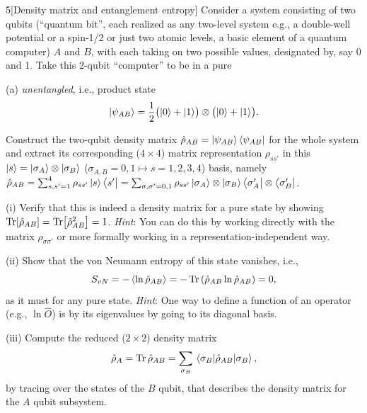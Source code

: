 \documentclass[12pt]{article}
\begin{document}
\begin{problem}{5}[Density matrix and entanglement entropy]
Consider a system consisting of two qubits (``quantum bit'', each realized as
any two-level system e.g., a double-well potential or a spin-1/2 or just two
atomic levels, a basic element of a quantum computer) $A$ and $B$, with each
taking on two possible values, designated by, say 0 and 1. Take this 2-qubit
``computer'' to be in a pure

(a) \textit{unentangled}, i.e., product state
\begin{equation}
    \ket{\psi_{AB}}=\frac12\qty(\ket{0}+\ket1)\otimes\qty(\ket0+\ket1).
\end{equation}

Construct the two-qubit density matrix
$\hat\rho_{AB}=\ket{\psi_{AB}}\bra{\psi_{AB}}$ for the whole system and extract
its corresponding ($4\times4$) matrix representation $\rho_{ss'}$ in this
$\ket{s}=\ket{\sigma_A}\otimes\ket{\sigma_B}$ ($\sigma_{A,B}=0,1\mapsto
s=1,2,3,4$) basis, namely
$\hat\rho_{AB}=\sum_{s,s'=1}^4\rho_{ss'}\ket{s}\bra{s'}=\sum_{\sigma,\sigma'=0,1}\rho_{ss'}\ket{\sigma_A}\otimes\ket{\sigma_{B}}\bra{\sigma_A'}\otimes\bra{\sigma_B'}$.

\qquad(i) Verify that this is indeed a density matrix for a pure state by
showing $\Tr[\hat\rho_{AB}]=\Tr[\hat\rho_{AB}^2]=1$. \textit{Hint}: You can do 
this by working directly with the matrix $\rho_{\sigma\sigma'}$ or more 
formally working in a representation-independent way.
\begin{solution}
    
\end{solution}

\qquad(ii) Show that the von Neumann entropy of this state vanishes, i.e.,
\begin{equation}
    S_{vN}=-\expval{\ln\hat\rho_{AB}}=-\Tr\qty(\hat\rho_{AB}\ln\hat\rho_{AB})=0, 
\end{equation}
as it must for any pure state. \textit{Hint}: One way to define a function of an
operator (e.g., $\ln\hat{O}$) is by its eigenvalues by going to its diagonal
basis.
\begin{solution}
\end{solution}

\qquad(iii) Compute the reduced ($2\times2$) density matrix
\begin{equation}
    \hat\rho_A=\Tr\hat\rho_{AB}=\sum_{\sigma_B}\ev{\hat\rho_{AB}}{\sigma_B},
\end{equation}
by tracing over the states of the $B$ qubit, that describes the density matrix
for the $A$ qubit subsystem.
\begin{solution}
    

\end{solution}
\end{problem}
\end{document}

